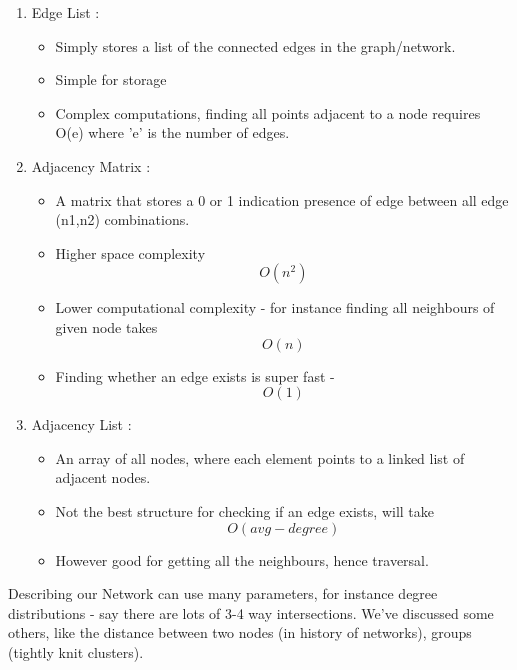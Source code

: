 \begin{enumerate}
  \item Edge List : 
  \begin{itemize}
    \item Simply stores a list of the connected edges in the graph/network.
    \item Simple for storage
    \item Complex computations, finding all points adjacent to a node requires O(e) where 'e' is the number of edges.
  \end{itemize}
  \item Adjacency Matrix : 
  \begin{itemize}
    \item A matrix that stores a 0 or 1 indication presence of edge between all edge (n1,n2) combinations.
    \item Higher space complexity \begin{equation}O(n^{2})\end{equation}
    \item Lower computational complexity - for instance finding all neighbours of given node takes \begin{equation}O(n)\end{equation}
    \item Finding whether an edge exists is super fast - \begin{equation}O(1)\end{equation}
  \end{itemize}
  \item Adjacency List : 
  \begin{itemize}
    \item An array of all nodes, where each element points to a linked list of adjacent nodes.
    \item Not the best structure for checking if an edge exists, will take \begin{equation}O(avg-degree)\end{equation}
    \item However good for getting all the neighbours, hence traversal.
  \end{itemize}
    
\end{enumerate}
Describing our Network can use many parameters, for instance degree distributions - say there are lots of 3-4 way intersections. We've discussed some others, like the distance between two nodes (in history of networks), groups (tightly knit clusters).

